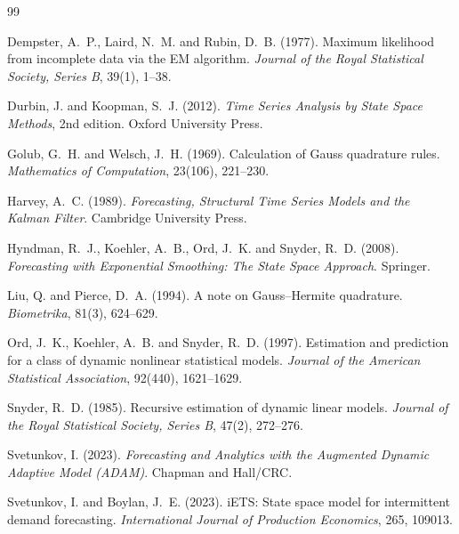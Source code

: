 \documentclass[11pt,a4paper]{article}
\theoremstyle{remark}
\begin{document}
\begin{thebibliography}{99}

Dempster, A.~P., Laird, N.~M. and Rubin, D.~B. (1977). Maximum likelihood from incomplete data via
the EM algorithm. \emph{Journal of the Royal Statistical Society, Series B}, 39(1), 1--38.

Durbin, J. and Koopman, S.~J. (2012). \emph{Time Series Analysis by State Space Methods}, 2nd
edition. Oxford University Press.

Golub, G.~H. and Welsch, J.~H. (1969). Calculation of Gauss quadrature rules. \emph{Mathematics of
Computation}, 23(106), 221--230.

Harvey, A.~C. (1989). \emph{Forecasting, Structural Time Series Models and the Kalman Filter}.
Cambridge University Press.

Hyndman, R.~J., Koehler, A.~B., Ord, J.~K. and Snyder, R.~D. (2008). \emph{Forecasting with
Exponential Smoothing: The State Space Approach}. Springer.

Liu, Q. and Pierce, D.~A. (1994). A note on Gauss--Hermite quadrature. \emph{Biometrika}, 81(3),
624--629.

Ord, J.~K., Koehler, A.~B. and Snyder, R.~D. (1997). Estimation and prediction for a class of
dynamic nonlinear statistical models. \emph{Journal of the American Statistical Association},
92(440), 1621--1629.

Snyder, R.~D. (1985). Recursive estimation of dynamic linear models. \emph{Journal of the Royal
Statistical Society, Series B}, 47(2), 272--276.

Svetunkov, I. (2023). \emph{Forecasting and Analytics with the Augmented Dynamic Adaptive Model
(ADAM)}. Chapman and Hall/CRC.

Svetunkov, I. and Boylan, J.~E. (2023). iETS: State space model for intermittent demand
forecasting. \emph{International Journal of Production Economics}, 265, 109013.

\end{thebibliography}
\end{document}
